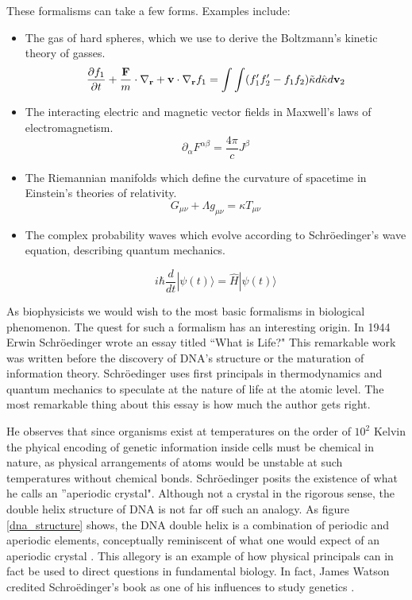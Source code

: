 These formalisms can take a few forms. Examples include:
\begin{itemize}
\item The gas of hard spheres, which we use to derive the Boltzmann's kinetic theory of gasses.  
\begin{equation}
	\label{hard_spheres}
	\frac{\partial f_1}{\partial t} + \frac{\bold{F}}{m}\cdot\nabla_\bold{r} + \bold{v} \cdot \nabla_\bold{r} f_1 =  \int \int (f'_1f'_2 - f_1 f_2) \tilde \kappa d \hat \kappa d \bold{v}_2
\end{equation}

\item The interacting electric and magnetic vector fields in Maxwell's laws of electromagnetism.
\begin{equation}
	\partial_\alpha F^{\alpha \beta} = \frac{4\pi}{c} J^\beta
\end{equation}

\item The Riemannian manifolds which define the curvature of spacetime in Einstein's theories of relativity.
\begin{equation}
	G_{\mu \nu} + \Lambda g_{\mu \nu} = \kappa T_{\mu \nu}
\end{equation}

\item The complex probability waves which evolve according to Schr\"oedinger's wave equation, describing quantum mechanics. 

\begin{equation}
	i \hbar \frac{d}{dt} | \psi (t) \rangle = \hat {H} | \psi (t) \rangle 
\end{equation}
\end{itemize}

As biophysicists we would wish to the most basic formalisms in biological phenomenon. The quest for such a formalism has an interesting origin. In 1944 Erwin Schr\"oedinger wrote an essay titled ``What is Life?" This remarkable work was written before the discovery of DNA's structure or the maturation of information theory. Schr\"oedinger uses first principals in thermodynamics and quantum mechanics to speculate at the nature of life at the atomic level. The most remarkable thing about this essay is how much the author gets right. 

He observes that since organisms exist at temperatures on the order of $10^2 $ Kelvin the phyical encoding of genetic information inside cells must be chemical in nature, as physical arrangements of atoms would be unstable at such temperatures without chemical bonds. Schr\"oedinger posits the existence of what he calls an ''aperiodic crystal". Although not a crystal in the rigorous sense, the double helix structure of DNA is not far off such an analogy. As figure \ref{dna_structure} shows, the DNA double helix is a combination of periodic and aperiodic elements, conceptually reminiscent of what one would expect of an aperiodic crystal \cite{varn2016}. This allegory is an example of how physical principals can in fact be used to direct questions in fundamental biology. In fact, James Watson credited Schro\"edinger's book as one of his influences to study genetics \cite{watson2010}.


